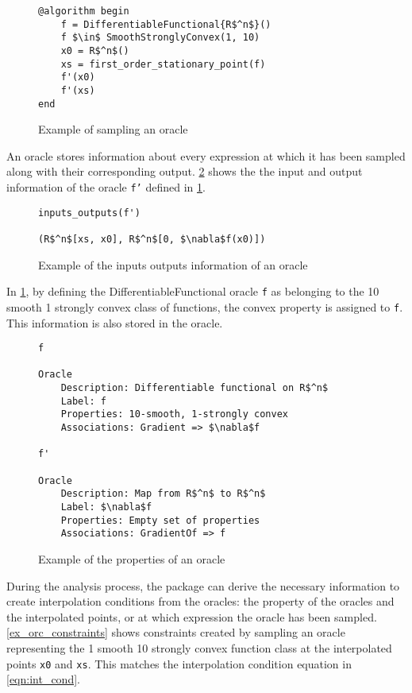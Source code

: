 \begin{figure}[!h]
	\begin{lstlisting}[mathescape]
@algorithm begin
	f = DifferentiableFunctional{R$^n$}()
	f $\in$ SmoothStronglyConvex(1, 10)
	x0 = R$^n$()
	xs = first_order_stationary_point(f)
	f'(x0)
	f'(xs)
end
\end{lstlisting}
\caption{Example of sampling an oracle}
\label{ex_sampling}
\end{figure}

An oracle stores information about every expression at which it has been sampled along with their corresponding output. \cref{ex_inputs_outputs} shows the the input and output information of the oracle \texttt{f'} defined in \cref{ex_sampling}.

\begin{figure}[!h]
	\begin{lstlisting}[mathescape]
inputs_outputs(f')

(R$^n$[xs, x0], R$^n$[0, $\nabla$f(x0)])
\end{lstlisting}
\caption{Example of the inputs outputs information of an oracle}
\label{ex_inputs_outputs}
\end{figure}

In \cref{ex_sampling}, by defining the DifferentiableFunctional oracle \texttt{f} as belonging to the 10 smooth 1 strongly convex class of functions, the convex property is assigned to \texttt{f}. This information is also stored in the oracle.

\begin{figure}[!h]
	\begin{lstlisting}[mathescape]
f

Oracle
	Description: Differentiable functional on R$^n$
	Label: f
	Properties: 10-smooth, 1-strongly convex
	Associations: Gradient => $\nabla$f

f'

Oracle
	Description: Map from R$^n$ to R$^n$
	Label: $\nabla$f
	Properties: Empty set of properties
	Associations: GradientOf => f
\end{lstlisting}
\caption{Example of the properties of an oracle}
\label{ex_properties}
\end{figure}

During the analysis process, the package can derive the necessary information to create interpolation conditions from the oracles: the property of the oracles and the interpolated points, or at which expression the oracle has been sampled. \cref{ex_orc_constraints} shows constraints created by sampling an oracle representing the 1 smooth 10 strongly convex function class at the interpolated points \texttt{x0} and \texttt{xs}. This matches the interpolation condition equation in \cref{eqn:int_cond}.

